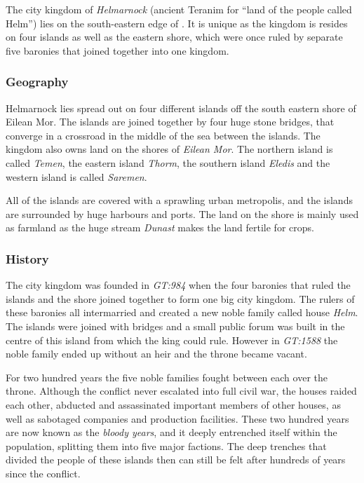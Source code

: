 The city kingdom of \emph{Helmarnock} (ancient Teranim for ``land of the
people called Helm'') lies on the south-eastern edge of . It is unique as the kingdom is resides on four islands as well as the
eastern shore, which were once ruled by separate five baronies that joined
together into one kingdom.

\subsubsection{Geography}

Helmarnock lies spread out on four different islands off the south eastern
shore of Eilean Mor. The islands are joined together by four huge stone
bridges, that converge in a crossroad in the middle of the sea between the
islands. The kingdom also owns land on the shores of \emph{Eilean Mor}.  The
northern island is called \emph{Temen}, the eastern island \emph{Thorm}, the
southern island \emph{Eledis} and the western island is called \emph{Saremen}.

All of the islands are covered with a sprawling urban metropolis, and the
islands are surrounded by huge harbours and ports. The land on the shore is
mainly used as farmland as the huge stream \emph{Dunast} makes the land
fertile for crops.

\subsubsection{History}

The city kingdom was founded in \emph{GT:984} when the four baronies that
ruled the islands and the shore joined together to form one big city kingdom.
The rulers of these baronies all intermarried and created a new noble family
called house \emph{Helm}. The islands were joined with bridges and a small
public forum was built in the centre of this island from which the king could
rule. However in \emph{GT:1588} the noble family ended up without an heir and
the throne became vacant.

For two hundred years the five noble families fought between each over the
throne. Although the conflict never escalated into full civil war, the houses
raided each other, abducted and assassinated important members of other
houses, as well as sabotaged companies and production facilities. These two
hundred years are now known as the \emph{bloody years}, and it deeply
entrenched itself within the population, splitting them into five major
factions. The deep trenches that divided the people of these islands then can
still be felt after hundreds of years since the conflict.

